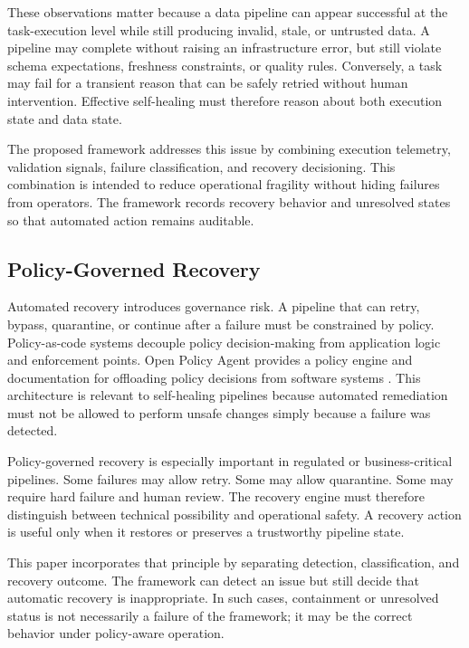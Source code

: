 These observations matter because a data pipeline can appear successful at the task-execution level while still producing invalid, stale, or untrusted data. A pipeline may complete without raising an infrastructure error, but still violate schema expectations, freshness constraints, or quality rules. Conversely, a task may fail for a transient reason that can be safely retried without human intervention. Effective self-healing must therefore reason about both execution state and data state.

The proposed framework addresses this issue by combining execution telemetry, validation signals, failure classification, and recovery decisioning. This combination is intended to reduce operational fragility without hiding failures from operators. The framework records recovery behavior and unresolved states so that automated action remains auditable.

\subsection{Policy-Governed Recovery}

Automated recovery introduces governance risk. A pipeline that can retry, bypass, quarantine, or continue after a failure must be constrained by policy. Policy-as-code systems decouple policy decision-making from application logic and enforcement points. Open Policy Agent provides a policy engine and documentation for offloading policy decisions from software systems \cite{opa2026docs}. This architecture is relevant to self-healing pipelines because automated remediation must not be allowed to perform unsafe changes simply because a failure was detected.

Policy-governed recovery is especially important in regulated or business-critical pipelines. Some failures may allow retry. Some may allow quarantine. Some may require hard failure and human review. The recovery engine must therefore distinguish between technical possibility and operational safety. A recovery action is useful only when it restores or preserves a trustworthy pipeline state.

This paper incorporates that principle by separating detection, classification, and recovery outcome. The framework can detect an issue but still decide that automatic recovery is inappropriate. In such cases, containment or unresolved status is not necessarily a failure of the framework; it may be the correct behavior under policy-aware operation.

